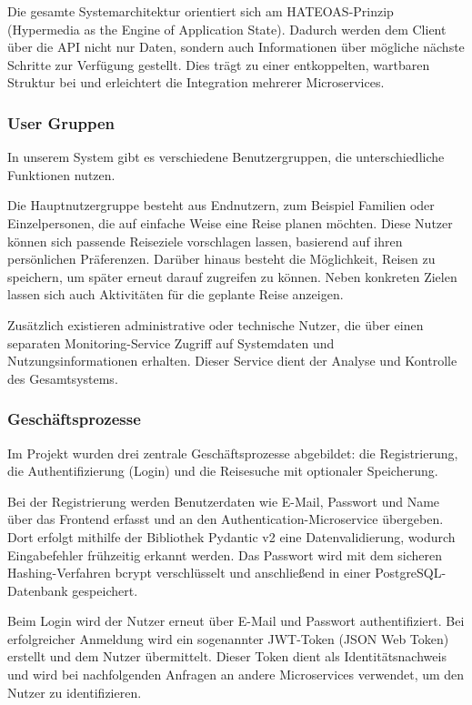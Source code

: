 Die gesamte Systemarchitektur orientiert sich am HATEOAS-Prinzip (Hypermedia as the Engine of Application State). Dadurch werden dem Client über die API nicht nur Daten, sondern auch Informationen über mögliche nächste Schritte zur Verfügung gestellt. Dies trägt zu einer entkoppelten, wartbaren Struktur bei und erleichtert die Integration mehrerer Microservices.

\subsubsection{User Gruppen}

In unserem System gibt es verschiedene Benutzergruppen, die unterschiedliche Funktionen nutzen.

Die Hauptnutzergruppe besteht aus Endnutzern, zum Beispiel Familien oder Einzelpersonen, die auf einfache Weise eine Reise planen möchten. Diese Nutzer können sich passende Reiseziele vorschlagen lassen, basierend auf ihren persönlichen Präferenzen. Darüber hinaus besteht die Möglichkeit, Reisen zu speichern, um später erneut darauf zugreifen zu können. Neben konkreten Zielen lassen sich auch Aktivitäten für die geplante Reise anzeigen.

Zusätzlich existieren administrative oder technische Nutzer, die über einen separaten Monitoring-Service Zugriff auf Systemdaten und Nutzungsinformationen erhalten. Dieser Service dient der Analyse und Kontrolle des Gesamtsystems.

\subsubsection{Geschäftsprozesse}

Im Projekt wurden drei zentrale Geschäftsprozesse abgebildet: die Registrierung, die Authentifizierung (Login) und die Reisesuche mit optionaler Speicherung.

Bei der Registrierung werden Benutzerdaten wie E-Mail, Passwort und Name über das Frontend erfasst und an den Authentication-Microservice übergeben. Dort erfolgt mithilfe der Bibliothek Pydantic v2 eine Datenvalidierung, wodurch Eingabefehler frühzeitig erkannt werden. Das Passwort wird mit dem sicheren Hashing-Verfahren bcrypt verschlüsselt und anschließend in einer PostgreSQL-Datenbank gespeichert.

Beim Login wird der Nutzer erneut über E-Mail und Passwort authentifiziert. Bei erfolgreicher Anmeldung wird ein sogenannter JWT-Token (JSON Web Token) erstellt und dem Nutzer übermittelt. Dieser Token dient als Identitätsnachweis und wird bei nachfolgenden Anfragen an andere Microservices verwendet, um den Nutzer zu identifizieren.

